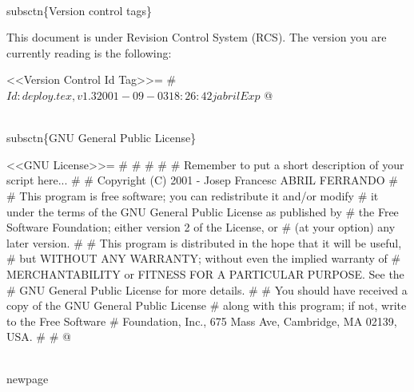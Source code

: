 \documentclass[11pt]{article}
\def\nwendcode{\endtrivlist \endgroup} %
\let\nwdocspar=\par                    %
\begin{document}
\nwenddocs{}\endmoddef
\\subsctn\{Version control tags\}

This document is under Revision Control System (RCS). The version you are currently reading is the following:

<<Version Control Id Tag>>=
# $Id: deploy.tex,v 1.3 2001-09-03 18:26:42 jabril Exp $
@ 

\nwendcode{}\nwdocspar

\nwenddocs{}\endmoddef
\\subsctn\{GNU General Public License\}

<<GNU License>>=
# %
# %
# %
# 
#    Remember to put a short description of your script here...
# 
#     Copyright (C) 2001 - Josep Francesc ABRIL FERRANDO  
#
# This program is free software; you can redistribute it and/or modify
# it under the terms of the GNU General Public License as published by
# the Free Software Foundation; either version 2 of the License, or
# (at your option) any later version.
# 
# This program is distributed in the hope that it will be useful,
# but WITHOUT ANY WARRANTY; without even the implied warranty of
# MERCHANTABILITY or FITNESS FOR A PARTICULAR PURPOSE.  See the
# GNU General Public License for more details.
# 
# You should have received a copy of the GNU General Public License
# along with this program; if not, write to the Free Software
# Foundation, Inc., 675 Mass Ave, Cambridge, MA 02139, USA.
# 
# %
@ 
\nwendcode{}\nwdocspar

\nwenddocs{}\endmoddef
\\newpage
\end{document}
